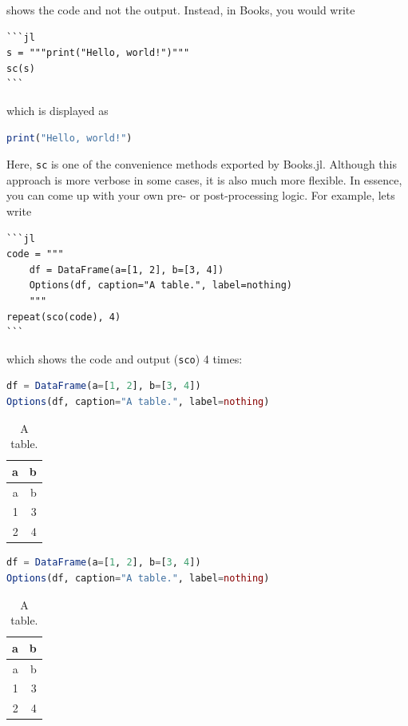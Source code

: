 \documentclass[
  notoc %
]{tufte-book}
\newcommand{\passthrough}[1]{#1}
\begin{document}
shows the code and not the output. Instead, in Books, you would write

\begin{lstlisting}
```jl
s = """print("Hello, world!")"""
sc(s)
```
\end{lstlisting}

which is displayed as

\begin{lstlisting}[language=Julia]
print("Hello, world!")
\end{lstlisting}

Here, \passthrough{\lstinline!sc!} is one of the convenience methods
exported by Books.jl. Although this approach is more verbose in some
cases, it is also much more flexible. In essence, you can come up with
your own pre- or post-processing logic. For example, lets write

\begin{lstlisting}
```jl
code = """
    df = DataFrame(a=[1, 2], b=[3, 4])
    Options(df, caption="A table.", label=nothing)
    """
repeat(sco(code), 4)
```
\end{lstlisting}

which shows the code and output (\passthrough{\lstinline!sco!}) 4 times:

\begin{lstlisting}[language=Julia]
df = DataFrame(a=[1, 2], b=[3, 4])
Options(df, caption="A table.", label=nothing)
\end{lstlisting}

\begin{longtable}[]{@{}rr@{}}
\caption{A table.}\tabularnewline
\toprule
a & b \\
\midrule
\endfirsthead
\toprule
a & b \\
\midrule
\endhead
1 & 3 \\
2 & 4 \\
\bottomrule
\end{longtable}

\begin{lstlisting}[language=Julia]
df = DataFrame(a=[1, 2], b=[3, 4])
Options(df, caption="A table.", label=nothing)
\end{lstlisting}

\begin{longtable}[]{@{}rr@{}}
\caption{A table.}\tabularnewline
\toprule
a & b \\
\midrule
\endfirsthead
\toprule
a & b \\
\midrule
\endhead
1 & 3 \\
2 & 4 \\
\bottomrule
\end{longtable}
\end{document}
